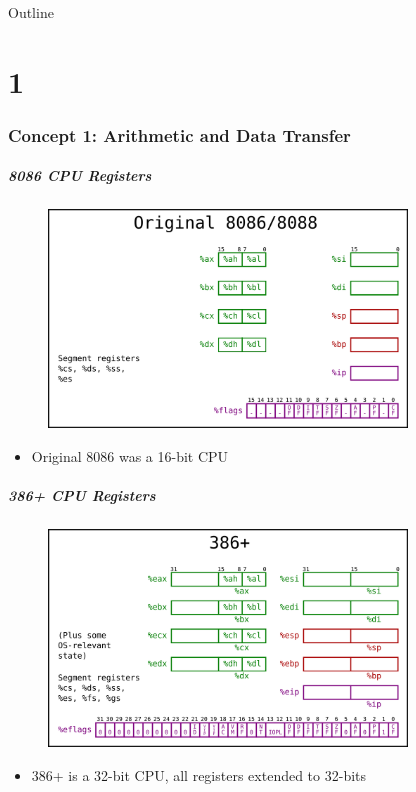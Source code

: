 \documentclass[11pt,xcolor=dvipsnames]{beamer}
\begin{document}
\begin{frame}{Outline}
\tableofcontents[part=2]
\end{frame}

\part{1}

\section{Concept 1: Arithmetic and Data Transfer}
\begin{frame}[fragile,t]
\frametitle{8086 CPU Registers}
\begin{figure}
\centering \includegraphics[width=0.85\textwidth]{figures/8086state.png}
\end{figure}
\begin{itemize}
    \item Original 8086 was a 16-bit CPU
\end{itemize}
\end{frame}

\begin{frame}[fragile,t]
\frametitle{386+ CPU Registers}
\begin{figure}
\centering \includegraphics[width=0.85\textwidth]{figures/386state.png}
\end{figure}
\begin{itemize}
    \item 386+ is a 32-bit CPU, all registers extended to 32-bits
\end{itemize}
\end{frame}
\end{document}
